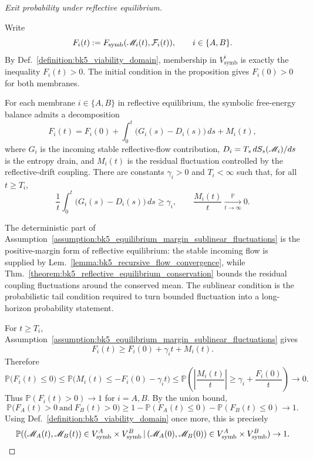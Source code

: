 \begin{proof}[Exit probability under reflective equilibrium]
\label{proof:bk5_viability_domain_preservation}
\leavevmode

Write
\[
F_i(t):=F_{\mathrm{symb}}(\mathscr{M}_i(t),\mathcal{F}_i(t)),
\qquad i\in\{A,B\}.
\]
By Def.~\ref{definition:bk5_viability_domain}, membership in \(V_{\text{symb}}^i\) is exactly the inequality \(F_i(t)>0\).  The initial condition in the proposition gives \(F_i(0)>0\) for both membranes.

\begin{assumption}
\label{assumption:bk5_equilibrium_margin_sublinear_fluctuations}
For each membrane \(i\in\{A,B\}\) in reflective equilibrium, the symbolic free-energy balance admits a decomposition
\[
F_i(t)=F_i(0)+\int_0^t\bigl(G_i(s)-D_i(s)\bigr)\,ds+M_i(t),
\]
where \(G_i\) is the incoming stable reflective-flow contribution, \(D_i=T_s\,dS_s(\mathscr{M}_i)/ds\) is the entropy drain, and \(M_i(t)\) is the residual fluctuation controlled by the reflective-drift coupling.  There are constants \(\gamma_i>0\) and \(T_i<\infty\) such that, for all \(t\ge T_i\),
\[
\frac1t\int_0^t\bigl(G_i(s)-D_i(s)\bigr)\,ds\ge\gamma_i,
\qquad
\frac{M_i(t)}{t}\xrightarrow[t\to\infty]{\mathbb{P}}0.
\]
\end{assumption}

The deterministic part of Assumption~\ref{assumption:bk5_equilibrium_margin_sublinear_fluctuations} is the positive-margin form of reflective equilibrium: the stable incoming flow is supplied by Lem.~\ref{lemma:bk5_recursive_flow_convergence}, while Thm.~\ref{theorem:bk5_reflective_equilibrium_conservation} bounds the residual coupling fluctuations around the conserved mean.  The sublinear condition is the probabilistic tail condition required to turn bounded fluctuation into a long-horizon probability statement.

For \(t\ge T_i\), Assumption~\ref{assumption:bk5_equilibrium_margin_sublinear_fluctuations} gives
\[
F_i(t)\ge F_i(0)+\gamma_i t+M_i(t).
\]
Therefore
\[
\mathbb{P}\bigl(F_i(t)\le0\bigr)
\le
\mathbb{P}\bigl(M_i(t)\le -F_i(0)-\gamma_i t\bigr)
\le
\mathbb{P}\left(\left|\frac{M_i(t)}{t}\right|\ge \gamma_i+\frac{F_i(0)}{t}\right)
\longrightarrow 0.
\]
Thus \(\mathbb{P}(F_i(t)>0)\to1\) for \(i=A,B\).  By the union bound,
\[
\mathbb{P}\bigl(F_A(t)>0 \ \text{and}\ F_B(t)>0\bigr)
\ge
1-\mathbb{P}(F_A(t)\le0)-\mathbb{P}(F_B(t)\le0)
\longrightarrow 1.
\]
Using Def.~\ref{definition:bk5_viability_domain} once more, this is precisely
\[
\mathbb{P}((\mathscr{M}_A(t), \mathscr{M}_B(t)) \in V_{\text{symb}}^A \times V_{\text{symb}}^B \,|\, (\mathscr{M}_A(0), \mathscr{M}_B(0)) \in V_{\text{symb}}^A \times V_{\text{symb}}^B) \to 1.
\]
\end{proof}
